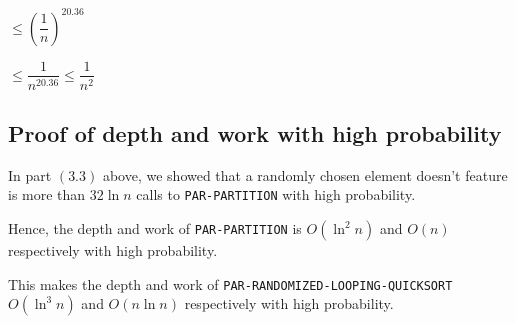 \documentclass{article}
\begin{document}
$\le \left(\dfrac{1}{n}\right)^{20.36}$

$\le \dfrac{1}{n^{20.36}} \le \dfrac{1}{n^{2}}$

\subsection{Proof of depth and work with high probability}

In part $(3.3)$ above, we showed that a randomly chosen element
doesn't feature is more than $32\ln{n}$ calls to
\texttt{PAR-PARTITION} with high probability.

Hence, the depth and work of \texttt{PAR-PARTITION} is $O(\ln^2{n})$
and $O(n)$ respectively with high probability.

This makes the depth and work of
\texttt{PAR-RANDOMIZED-LOOPING-QUICKSORT} $O(\ln^3{n})$ and
$O(n\ln{n})$ respectively with high probability.
\end{document}
